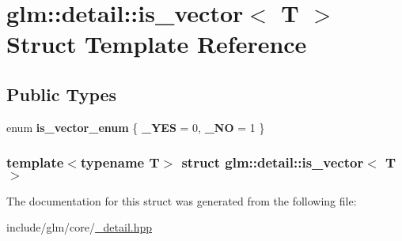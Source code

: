 \hypertarget{structglm_1_1detail_1_1is__vector}{\section{glm\-:\-:detail\-:\-:is\-\_\-vector$<$ \-T $>$ \-Struct \-Template \-Reference}
\label{structglm_1_1detail_1_1is__vector}
}
\subsection*{\-Public \-Types}
\begin{DoxyCompactItemize}
\item 
enum {\bfseries is\-\_\-vector\-\_\-enum} \{ {\bfseries \-\_\-\-Y\-E\-S} =  0, 
{\bfseries \-\_\-\-N\-O} =  1
 \}
\end{DoxyCompactItemize}
\subsubsection*{template$<$typename T$>$ struct glm\-::detail\-::is\-\_\-vector$<$ T $>$}



\-The documentation for this struct was generated from the following file\-:\begin{DoxyCompactItemize}
\item 
include/glm/core/\hyperlink{__detail_8hpp}{\-\_\-detail.\-hpp}\end{DoxyCompactItemize}
